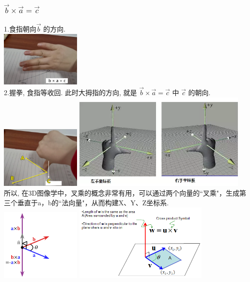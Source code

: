 \documentclass[UTF8]{ctexart}
\begin{document}
\subsubsection{$\vec{b} \times \vec{a} = \vec{c}$}


1.食指朝$向\vec{b}$ 的方向. \\
\includegraphics[width=0.3\textwidth]{img/0085.png}\\

2.握拳, 食指等收回. 此时大拇指的方向, 就是 $\vec{b} \times \vec{a} = \vec{c}$ 中 $\vec{c}$ 的朝向. \\
\includegraphics[width=0.3\textwidth]{img/0086.png}
\includegraphics[width=0.65\textwidth]{img/0090.png}\\

所以, 在3D图像学中，叉乘的概念非常有用，可以通过两个向量的``叉乘"，生成第三个垂直于a，b的``法向量"，从而构建X、Y、Z坐标系. \\

\includegraphics[width=0.3\textwidth]{img/0087.png}
\includegraphics[width=0.5\textwidth]{img/0088.png}\\
\end{document}

